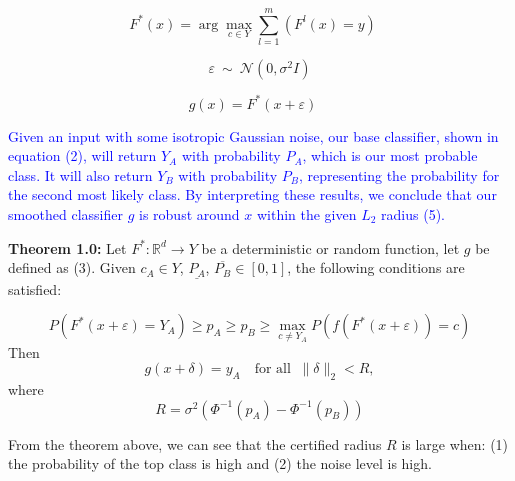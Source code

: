 \documentclass{article}
\begin{document}
\begin{equation}
F^*(x) = \arg\max_{c \in Y}\sum_{l=1}^{m} (F^l(x) = y) \quad 
\end{equation}

\[
\varepsilon \ \sim \ \mathcal{N}(0, \sigma^2 I)
\]

\begin{equation}
g(x) = F^*(x + \varepsilon) \quad 
\end{equation}

\textcolor{blue}{
Given an input with some isotropic Gaussian noise, our base classifier, shown in equation (2), will return \( Y_A \) with probability \( P_A \), which is our most probable class. It will also return \( Y_B \) with probability \( P_B \), representing the probability for the second most likely class. By interpreting these results, we conclude that our smoothed classifier \( g \) is robust around \( x \) within the given \( L_2 \) radius (5).}

\vspace{\baselineskip}

\textbf{Theorem 1.0:} Let \( F^*: \mathbb{R}^d \rightarrow Y \) be a deterministic or random function, let \( g \) be defined as (3). Given \( c_A \in Y \), \(\underline{P_A} \), \(\overline{P_B} \in [0,1] \), the following conditions are satisfied:

\[
P(F^*(x + \varepsilon) = Y_A) \geq p_A \geq p_B \geq \max_{c \neq Y_A} P(f(F^*(x + \varepsilon)) = c)
\]
Then 
\begin{equation}
g(x + \delta) = y_A \quad \text{for all }~\lVert \delta \rVert_2 < R,
\end{equation}
where
\begin{equation}
R = \sigma^2 (\Phi^{-1}(p_A) - \Phi^{-1}(p_B))
\end{equation}

From the theorem above, we can see that the certified radius \( R \) is large when: (1) the probability of the top class is high and (2) the noise level is high. \vspace{12pt}
\end{document}
